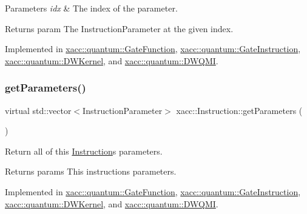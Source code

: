 \begin{DoxyParams}{Parameters}
{\em idx} & The index of the parameter. \\
\hline
\end{DoxyParams}
\begin{DoxyReturn}{Returns}
param The Instruction\+Parameter at the given index. 
\end{DoxyReturn}


Implemented in \hyperlink{a01011_a5991903323e412777bedc4f0c862eb63}{xacc\+::quantum\+::\+Gate\+Function}, \hyperlink{a01015_addd6185279fe99fbdc3d4efd96e42162}{xacc\+::quantum\+::\+Gate\+Instruction}, \hyperlink{a00983_a81711b7db284aba35d6952e4d1d15d41}{xacc\+::quantum\+::\+D\+W\+Kernel}, and \hyperlink{a00987_aa15882df55d3f0af3a2ec9d72a2db4c0}{xacc\+::quantum\+::\+D\+W\+Q\+MI}.

\mbox{\label{a01155_aeb67c67713896e8f27a5c7dd531f3340}} 
\subsubsection{\texorpdfstring{get\+Parameters()}{getParameters()}}
{\footnotesize\ttfamily virtual std\+::vector$<$Instruction\+Parameter$>$ xacc\+::\+Instruction\+::get\+Parameters (\begin{DoxyParamCaption}{ }\end{DoxyParamCaption})\hspace{0.3cm}{\ttfamily [pure virtual]}}

Return all of this \hyperlink{a01155}{Instruction}\textquotesingle{}s parameters.

\begin{DoxyReturn}{Returns}
params This instructions parameters. 
\end{DoxyReturn}


Implemented in \hyperlink{a01011_af7aabfe699a4dced576ff7fafff969d5}{xacc\+::quantum\+::\+Gate\+Function}, \hyperlink{a01015_a8584444f9577283f6844ab32bdc4db72}{xacc\+::quantum\+::\+Gate\+Instruction}, \hyperlink{a00983_a829462cff34e2257da06afd8a2051a8e}{xacc\+::quantum\+::\+D\+W\+Kernel}, and \hyperlink{a00987_a896d9a4e2876129c2cf81ef028daf1ff}{xacc\+::quantum\+::\+D\+W\+Q\+MI}.

\mbox{\label{a01155_a4383f1036d0fcfe890ab9c613dbd5f38}} 
